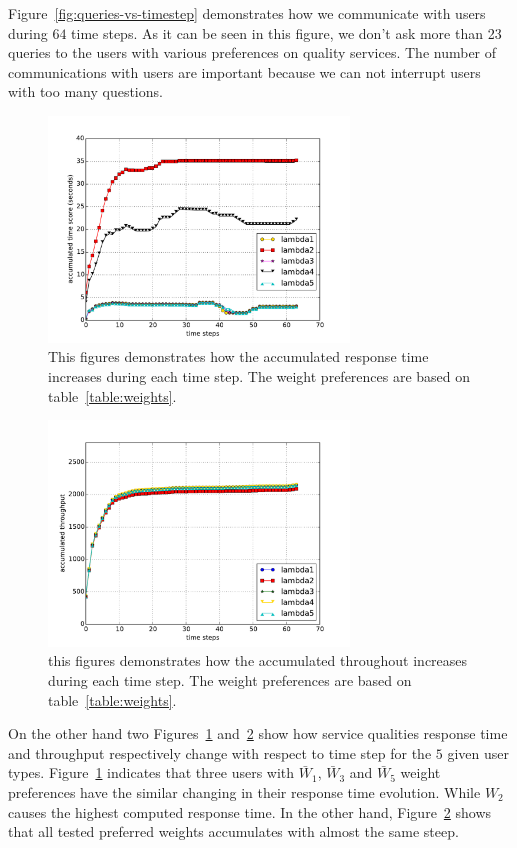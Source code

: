 \documentclass[10pt,journal,compsoc]{IEEEtran}
\begin{document}
Figure~\ref{fig:queries-vs-timestep} demonstrates how we communicate with users during $64$ time steps. As it can be seen in this figure, we don't ask more than 23 queries to the users with various preferences on quality services. The number of communications with users are important because we can not interrupt users with too many questions. 

 
\begin{figure}[t]
\includegraphics[width=8cm]{graphs/rt_step}
\caption{This figures demonstrates how the accumulated response time increases during each time step. The weight preferences are based on table~\ref{table:weights}.} 
\centering
\label{fig:rt-vs-timestep}
\end{figure}

\begin{figure}[t]
\includegraphics[width=8cm]{graphs/trough_step}
\caption{this figures demonstrates how the accumulated throughout increases during each time step. The weight preferences are based on table~\ref{table:weights}.}
\centering
\label{fig:trput-vs-timestep}
\end{figure} 

On the other hand two Figures~\ref{fig:rt-vs-timestep} and~\ref{fig:trput-vs-timestep} show how service qualities response time and throughput respectively change with respect to time step for the $5$ given user types. Figure~\ref{fig:rt-vs-timestep} indicates that three users with $\bar{W}_1$, $\bar{W}_3$ and $\bar{W}_5$ weight preferences have the similar changing in their response time evolution. While $W_2$ causes the highest computed response time. In the other hand, Figure~\ref{fig:trput-vs-timestep} shows that all tested preferred weights accumulates with almost the same steep.
\end{document}
